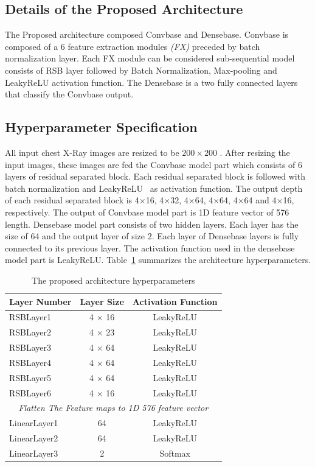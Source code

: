 \subsection{Details of the Proposed Architecture}
The Proposed architecture composed Convbase and Densebase. Convbase is composed of a $6$ feature extraction modules \textit{(FX)} preceded by batch normalization layer. Each FX module can be considered sub-sequential model consists of RSB layer followed by Batch Normalization, Max-pooling and LeakyReLU activation function. The Densebase is a two fully connected layers that classify the Convbase output.


\subsection{Hyperparameter Specification}
All input chest X-Ray images are resized to be $200\times 200$ . After resizing the input images, these images are fed the Convbase model part which consists of 6 layers of residual separated block. Each residual separated block is followed with batch normalization and LeakyReLU~\cite{he2015delving} as activation function. The output depth of each residual separated block is 4$\times$16, 4$\times$32, 4$\times$64, 4$\times$64, 4$\times$64 and 4$\times$16, respectively. The output of Convbase model part is 1D feature vector of 576 length. Densebase model part consists of two hidden layers. Each layer has the  size of 64 and the output layer of size 2. Each layer of Densebase layers is fully connected to its previous layer. The activation function used in the densebase model part is LeakyReLU. Table~\ref{lyrSpec} summarizes the architecture hyperparameters.

\begin{table}[htbp]
\caption{The proposed architecture hyperparameters}
\begin{center}

\begin{tabular}{|l|c|c|}
\hline
\textbf{Layer Number} & \textbf{Layer Size} & \textbf{Activation Function} \\
\hline
\hline
RSBLayer1 & 4 $\times$ 16 & LeakyReLU\\
\hline
RSBLayer2 & 4 $\times$ 23 & LeakyReLU\\
\hline
RSBLayer3 & 4 $\times$ 64 & LeakyReLU\\
\hline
RSBLayer4 & 4 $\times$ 64 & LeakyReLU\\
\hline
RSBLayer5 & 4 $\times$ 64 & LeakyReLU\\
\hline
RSBLayer6 & 4 $\times$ 16 & LeakyReLU\\
\hline
\multicolumn{3}{|c|}{\textit{Flatten The Feature maps to 1D 576 feature  vector}}\\
\cline{1-3}
LinearLayer1 & 64 & LeakyReLU\\
\hline
LinearLayer2 & 64 & LeakyReLU\\
\hline
LinearLayer3 & 2 & Softmax\\
\hline
\end{tabular}
\label{lyrSpec}
\end{center}
\end{table}

